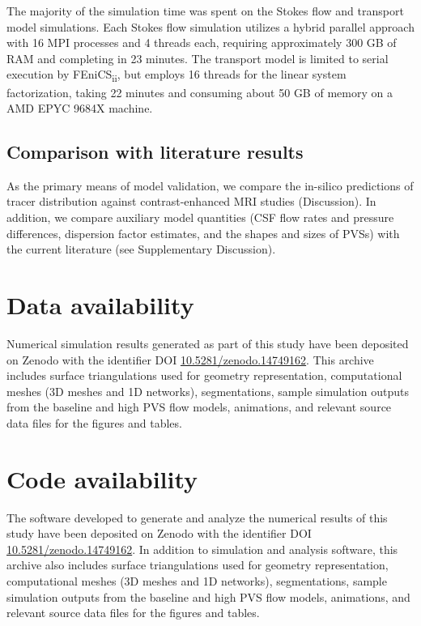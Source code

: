 \documentclass[fleqn,10pt]{wlscirep}
\begin{document}
The majority of the simulation time was spent on the Stokes flow and transport model simulations. Each Stokes flow simulation utilizes a hybrid parallel approach with 16 MPI processes and 4 threads each, requiring approximately 300 GB of RAM and completing in 23 minutes. The transport model is limited to serial execution by FEniCS\textsubscript{ii}, but employs 16 threads for the linear system factorization, taking 22 minutes and consuming about 50 GB of memory on a AMD EPYC 9684X machine.

\subsection*{Comparison with literature results}

As the primary means of model validation, we compare the in-silico
predictions of tracer distribution against contrast-enhanced MRI
studies (Discussion). In addition, we compare auxiliary model
quantities (CSF flow rates and pressure differences, dispersion factor
estimates, and the shapes and sizes of PVSs) with the current
literature (see Supplementary Discussion).

\section*{Data availability}

Numerical simulation results generated as part of this study have been deposited on Zenodo with the identifier DOI \href{https://doi.org/10.5281/zenodo.14749162}{10.5281/zenodo.14749162}. This archive includes surface triangulations used for geometry representation, computational meshes (3D meshes and
1D networks), segmentations, sample simulation outputs from the
baseline and high PVS flow models, animations, and relevant source data files
for the figures and tables.

\section*{Code availability}

The software developed to generate and analyze the numerical results
of this study have been deposited on Zenodo with the identifier DOI \href{https://doi.org/10.5281/zenodo.14749162}{10.5281/zenodo.14749162}. In addition to simulation and analysis software, this archive also includes surface triangulations used for geometry representation, computational meshes (3D meshes and 1D
networks), segmentations, sample simulation outputs from the baseline
and high PVS flow models, animations, and relevant source data files for the
figures and tables.
\end{document}
